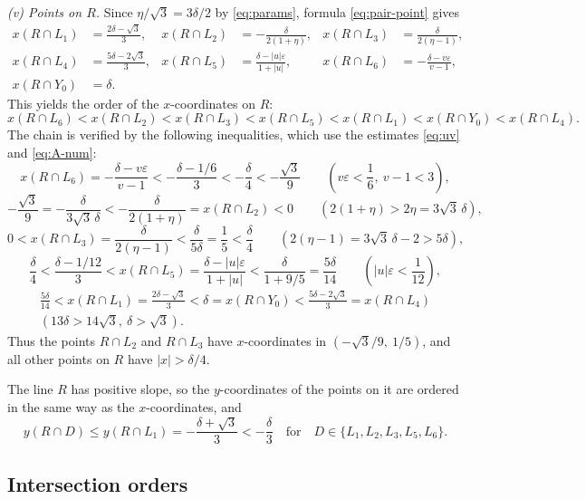 \emph{(v) Points on $R$.} Since $\eta/\sqrt3=3\delta/2$ by \eqref{eq:params}, formula \eqref{eq:pair-point} gives
\[
\begin{aligned}
x(R\cap L_1)&=\frac{2\delta-\sqrt3}3, & x(R\cap L_2)&=-\frac{\delta}{2(1+\eta)}, & x(R\cap L_3)&=\frac{\delta}{2(\eta-1)},\\
x(R\cap L_4)&=\frac{5\delta-2\sqrt3}3, & x(R\cap L_5)&=\frac{\delta-|u|\varepsilon}{1+|u|}, & x(R\cap L_6)&=-\frac{\delta-v\varepsilon}{v-1},\\
x(R\cap Y_0)&=\delta.
\end{aligned}
\]
This yields the order of the $x$-coordinates on $R$:
\[
x(R\cap L_6)<x(R\cap L_2)<x(R\cap L_3)<x(R\cap L_5)
<x(R\cap L_1)<x(R\cap Y_0)<x(R\cap L_4).
\]
The chain is verified by the following inequalities, which use the estimates \eqref{eq:uv} and \eqref{eq:A-num}:
\[
x(R\cap L_6)=-\frac{\delta-v\varepsilon}{v-1}<-\frac{\delta-1/6}3<-\frac\delta4<-\frac{\sqrt3}9
\qquad\left(v\varepsilon<\frac16,\ v-1<3\right),
\]
\[
-\frac{\sqrt3}9=-\frac\delta{3\sqrt3\,\delta}<-\frac\delta{2(1+\eta)}=x(R\cap L_2)<0
\qquad\left(2(1+\eta)>2\eta=3\sqrt3\,\delta\right),
\]
\[
0<x(R\cap L_3)=\frac\delta{2(\eta-1)}<\frac\delta{5\delta}=\frac15<\frac\delta4
\qquad\left(2(\eta-1)=3\sqrt3\,\delta-2>5\delta\right),
\]
\[
\frac\delta4<\frac{\delta-1/12}3<x(R\cap L_5)=\frac{\delta-|u|\varepsilon}{1+|u|}
<\frac\delta{1+9/5}=\frac{5\delta}{14}
\qquad\left(|u|\varepsilon<\frac1{12}\right),
\]
\[
\begin{gathered}
\frac{5\delta}{14}<x(R\cap L_1)=\frac{2\delta-\sqrt3}3<\delta=x(R\cap Y_0)
<\frac{5\delta-2\sqrt3}3=x(R\cap L_4)\\
\left(13\delta>14\sqrt3,\ \delta>\sqrt3\right).
\end{gathered}
\]
Thus the points $R\cap L_2$ and $R\cap L_3$ have $x$-coordinates in $(-\sqrt3/9,\ 1/5)$, and all other points on $R$ have $|x|>\delta/4$.

The line $R$ has positive slope, so the $y$-coordinates of the points on it are ordered in the same way as the $x$-coordinates, and
\begin{equation}\label{eq:y-neg}
y(R\cap D)\le y(R\cap L_1)=-\frac{\delta+\sqrt3}3<-\frac\delta3
\quad\text{for}\quad
D\in\{L_1,L_2,L_3,L_5,L_6\} .
\end{equation}

\subsection{Intersection orders}

